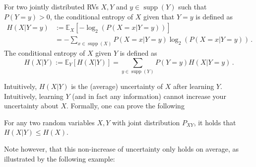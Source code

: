 \documentclass[11pt,leqno,a4paper]{report}\usepackage[]{graphicx}\usepackage[]{color}
\newcommand{\supp}{\operatorname{supp}}
\newcommand{\E}{\mathbb{E}}
\begin{document}
\begin{Definition}
For two jointly distributed RVs $ X,Y $ and $y \in \supp(Y)$ such that $P(Y=y)>0$, the conditional entropy of $ X $ given that $ Y=y $ is defined as
\begin{align*}
H(X | Y=y) &:= \E_X[-\log_{2}(P(X=x | Y=y))] \\
&= - \!\! \sum_{x \in \supp(X)} P(X=x | Y=y) \log_2(P(X=x | Y=y))\, . 
\end{align*}
The conditional entropy of $X$ given $Y$ is defined as
$$ H(X | Y) := \E_Y[ H(X | Y) ] = \sum_{y \in \supp(Y)} P(Y=y) H(X | Y=y) \, .$$
\end{Definition}

Intuitively, $H(X | Y)$ is the (average) uncertainty of $X$ after learning $Y$. Intuitively, learning $Y$ (and in fact any information) cannot increase your uncertainty about $X$. Formally, one can prove the following 
\begin{Lemma} \label{lemma:noincrease}
For any two random variables $X,Y$ with joint distribution $P_{XY}$, it holds that $H(X | Y) \leq H(X)$.
\end{Lemma}
Note however, that this non-increase of uncertainty only holds on average, as illustrated by the following example:
\end{document}
